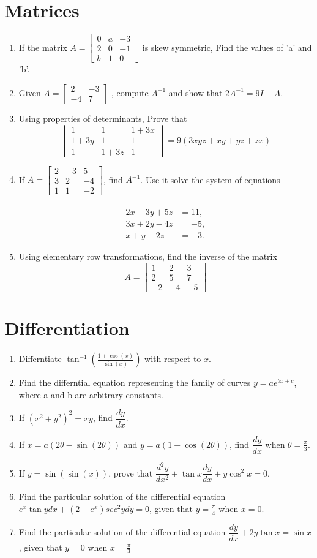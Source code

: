 \documentclass{article}
\newcommand{\myvec}[1]{\ensuremath{\begin{bmatrix}#1\end{bmatrix}}}
\newcommand{\mydet}[1]{\ensuremath{\begin{vmatrix}#1\end{vmatrix}}}
\providecommand{\brak}[1]{\ensuremath{\left(#1\right)}}
\begin{document}
\section{Matrices}
\begin{enumerate}
	\item If the matrix $ A=\myvec{
		0 & a & -3\\
		2 & 0 & -1\\
		b & 1 & 0}$ is skew symmetric, Find the values of 'a' and 'b'.
\item Given $ A = \myvec{
		2 & -3\\
		-4 & 7}$ , compute $A^{-1}$ and show that $2A^{-1}=9I - A$.
\item Using properties of determinants, Prove that \[ \mydet{
		1 & 1 & 1+3x \\
		1+3y & 1 & 1 \\
		1 & 1+3z & 1}
	=9\brak{3xyz+xy+yz+zx}\]
\item If $A=\myvec{
		2 & -3 & 5 \\
		3 & 2 & -4 \\
		1 & 1 & -2}$, find $ A^{-1}$. Use it solve the system of equations\\
\\
\begin{align*}
2x-3y+5z&=11,\\3x+2y-4z&=-5,\\x+y-2z&=-3.
\end{align*}
\item Using elementary row transformations, find the inverse of the matrix 
	\[  A=\myvec{
		1 & 2 & 3\\
		2 & 5 & 7\\
		-2 & -4 & -5} \]
\end{enumerate}
\section{Differentiation}
\begin{enumerate}  
\item Differntiate $\tan^{-1} \brak{\frac{1+\cos(x)}{\sin(x)}}$ with respect to  $x$.
\item Find the differntial equation representing the family of curves $y=ae^{bx+c}$, where a and b are arbitrary constants.
\item If $\brak{x^{2}+y^{2}}^{2}=xy$, find $\dfrac{dy}{dx}$.
\item If $x=a\brak{2\theta - \sin \brak{2\theta}}$ and $y=a\brak{1-\cos\brak{2\theta}}$, find $\dfrac{dy}{dx}$
when $\theta = \frac{\pi}{3}$.
\item If $y=\sin \brak{\sin \brak{x}}$, prove that $\dfrac{d^{2}y}{dx^{2}}+\tan x \dfrac{dy}{dx}+y\cos^{2}x=0$.
\item Find the particular solution of the differential equation $e^{x}\tan y dx+\brak{2-e^{x}}sec^{2}y dy=0$, given that $y=\frac {\pi}{4}$ when $x=0$.
\item Find the particular solution of the differential equation $\dfrac {dy}{dx} +2y \tan x= \sin x$, given that $y=0$ when $x=\frac{\pi}{3}$	
\end{enumerate}
\end{document}

